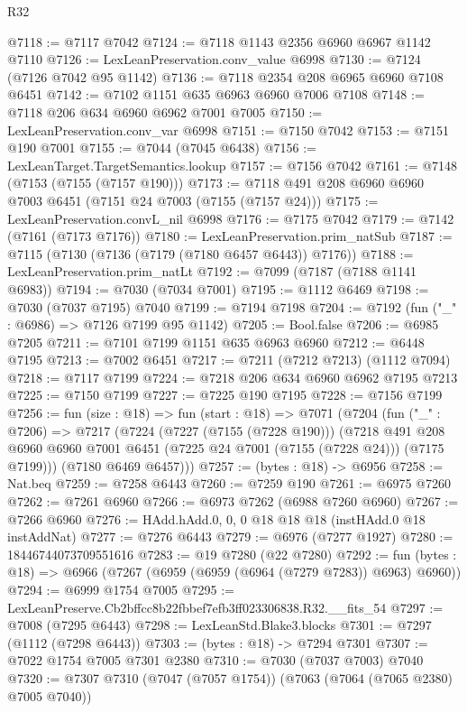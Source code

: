 \begin{lexlean}{R32}
\begin{coremodule}
@7118 := @7117 @7042
@7124 := @7118 @1143 @2356 @6960 @6967 @1142 @7110
@7126 := LexLeanPreservation.conv_value @6998
@7130 := @7124 (@7126 @7042 @95 @1142)
@7136 := @7118 @2354 @208 @6965 @6960 @7108 @6451
@7142 := @7102 @1151 @635 @6963 @6960 @7006 @7108
@7148 := @7118 @206 @634 @6960 @6962 @7001 @7005
@7150 := LexLeanPreservation.conv_var @6998
@7151 := @7150 @7042
@7153 := @7151 @190 @7001
@7155 := @7044 (@7045 @6438)
@7156 := LexLeanTarget.TargetSemantics.lookup
@7157 := @7156 @7042
@7161 := @7148 (@7153 (@7155 (@7157 @190)))
@7173 := @7118 @491 @208 @6960 @6960 @7003 @6451 (@7151 @24 @7003 (@7155 (@7157 @24)))
@7175 := LexLeanPreservation.convL_nil @6998
@7176 := @7175 @7042
@7179 := @7142 (@7161 (@7173 @7176))
@7180 := LexLeanPreservation.prim_natSub
@7187 := @7115 (@7130 (@7136 (@7179 (@7180 @6457 @6443)) @7176))
@7188 := LexLeanPreservation.prim_natLt
@7192 := @7099 (@7187 (@7188 @1141 @6983))
@7194 := @7030 (@7034 @7001)
@7195 := @1112 @6469
@7198 := @7030 (@7037 @7195) @7040
@7199 := @7194 @7198
@7204 := @7192 (fun ("_" : @6986) => @7126 @7199 @95 @1142)
@7205 := Bool.false
@7206 := @6985 @7205
@7211 := @7101 @7199 @1151 @635 @6963 @6960
@7212 := @6448 @7195
@7213 := @7002 @6451
@7217 := @7211 (@7212 @7213) (@1112 @7094)
@7218 := @7117 @7199
@7224 := @7218 @206 @634 @6960 @6962 @7195 @7213
@7225 := @7150 @7199
@7227 := @7225 @190 @7195
@7228 := @7156 @7199
@7256 := fun (size : @18) =>
  fun (start : @18) =>
  @7071
    (@7204
      (fun ("_" : @7206) =>
      @7217
        (@7224
          (@7227 (@7155 (@7228 @190)))
          (@7218
            @491
            @208
            @6960
            @6960
            @7001
            @6451
            (@7225 @24 @7001 (@7155 (@7228 @24)))
            (@7175 @7199)))
        (@7180 @6469 @6457)))
@7257 := (bytes : @18) -> @6956
@7258 := Nat.beq
@7259 := @7258 @6443
@7260 := @7259 @190
@7261 := @6975 @7260
@7262 := @7261 @6960
@7266 := @6973 @7262 (@6988 @7260 @6960)
@7267 := @7266 @6960
@7276 := HAdd.hAdd.{0, 0, 0} @18 @18 @18 (instHAdd.{0} @18 instAddNat)
@7277 := @7276 @6443
@7279 := @6976 (@7277 @1927)
@7280 := 18446744073709551616
@7283 := @19 @7280 (@22 @7280)
@7292 := fun (bytes : @18) => @6966 (@7267 (@6959 (@6959 (@6964 (@7279 @7283)) @6963) @6960))
@7294 := @6999 @1754 @7005
@7295 := LexLeanPreserve.Cb2bffcc8b22fbbef7efb3ff023306838.R32.__fits_54
@7297 := @7008 (@7295 @6443)
@7298 := LexLeanStd.Blake3.blocks
@7301 := @7297 (@1112 (@7298 @6443))
@7303 := (bytes : @18) -> @7294 @7301
@7307 := @7022 @1754 @7005 @7301 @2380
@7310 := @7030 (@7037 @7003) @7040
@7320 := @7307 @7310 (@7047 (@7057 @1754)) (@7063 (@7064 (@7065 @2380) @7005 @7040))

\end{coremodule}
\end{lexlean}
